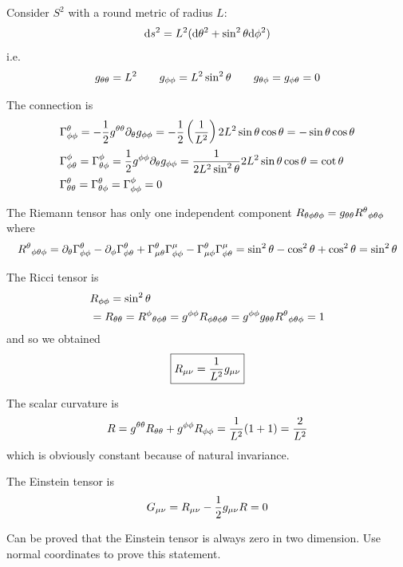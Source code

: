 \documentclass[../main/main.tex]{subfiles}
\begin{document}
\begin{example}

Consider $S^2$ with a round metric of radius $L$:
\[\textup{d} s^2=L^2(\textup{d}\theta^2+\sin^2\theta\textup{d}\phi^2)\]
i.e.
\[g_{\theta \theta}=L^2\qquad g_{\phi \phi}=L^2\sin^2\theta\qquad g_{\theta \phi}=g_{\phi \theta}=0\]

The connection is
\begin{align*}
&{\Gamma}^{\theta}_{\phi \phi}=-\frac12g^{\theta \theta}\partial_{\theta}g_{\phi \phi}=-\frac12\left(\frac1{L^2}\right)2L^2\sin\theta\cos\theta=-\sin\theta\cos\theta\\
&{\Gamma}^{\phi}_{\phi \theta}={\Gamma}^{\phi}_{\theta \phi}=\frac12g^{\phi \phi}\partial_{\theta}g_{\phi \phi}=\frac1{2L^2\sin^2\theta}2L^2\sin\theta\cos\theta=\cot\theta\\
&{\Gamma}^{\theta}_{\theta \theta}={\Gamma}^{\theta}_{\theta \phi}={\Gamma}^{\phi}_{\phi \phi}=0
\end{align*}

The Riemann tensor has only one independent component $R_{\theta\phi\theta\phi}=g_{\theta \theta}{{R}^{\theta}}_{\phi \theta \phi}$ where
\[{{R}^{\theta}}_{\phi \theta \phi}=\partial_{\theta}{\Gamma}^{\theta}_{\phi \phi}-\partial_{\phi}{\Gamma}^{\theta}_{\phi \theta}+{\Gamma}^{\theta}_{\mu \theta}{\Gamma}^{\mu}_{\phi \phi}-{\Gamma}^{\theta}_{\mu \phi}{\Gamma}^{\mu}_{\phi \theta}=\sin^2\theta-\cos^2\theta+\cos^2\theta=\sin^2\theta\]

The Ricci tensor is
\begin{align*}
&R_{\phi\phi}=\sin^2\theta\\
&=R_{\theta\theta}={{R}^{\phi}}_{\theta \phi \theta}=g^{\phi \phi} R_{\phi\theta\phi\theta}=g^{\phi \phi}g_{\theta \theta}{{R}^{\theta}}_{\phi \theta \phi}=1
\end{align*}
and so we obtained
\begin{equation}\boxed{
R_{\mu \nu}=\frac1{L^2}g_{\mu \nu}
}\end{equation}

The scalar curvature is 
\[R=g^{\theta \theta}R_{\theta \theta}+g^{\phi \phi}R_{\phi \phi}=\frac1{L^2}(1+1)=\frac2{L^2}\]
which is obviously constant because of natural invariance. 

The Einstein tensor is 
\[G_{\mu \nu}=R_{\mu \nu}-\frac12g_{\mu \nu} R=0\]

Can be proved that the Einstein tensor is always zero in two dimension. Use normal coordinates to prove this statement. 

\end{example}
\end{document}
